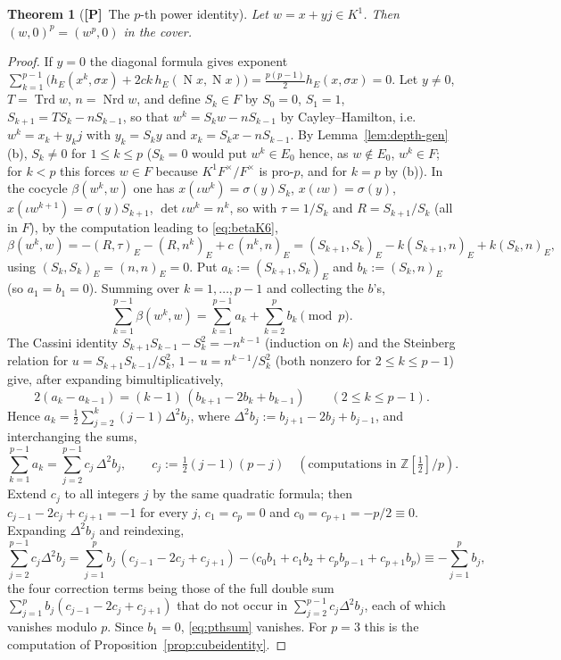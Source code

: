 \documentclass[11pt]{article}
\newcommand{\Z}{\mathbb Z}
\newcommand{\Nm}{\operatorname N}
\newcommand{\Nrd}{\operatorname{Nrd}}
\newcommand{\Trd}{\operatorname{Trd}}
\newcommand{\Ptag}{\textnormal{\textbf{[P]}}}
\theoremstyle{plain}
\newtheorem{theorem}{Theorem}[section]
\theoremstyle{definition}
\begin{document}
\begin{theorem}[\Ptag\ The $p$-th power identity]\label{thm:pthpower}
Let $w=x+yj\in K^1$.  Then $(w,0)^p=(w^p,0)$ in the cover.
\end{theorem}
\begin{proof}
If $y=0$ the diagonal formula gives exponent
$\sum_{k=1}^{p-1}\bigl(h_E(x^k,\sigma x)+2ck\,h_E(\Nm x,\Nm x)\bigr)=\tfrac{p(p-1)}2h_E(x,\sigma x)=0$.
Let $y\ne0$, $T=\Trd w$, $n=\Nrd w$, and define $S_k\in F$ by
$S_0=0$, $S_1=1$, $S_{k+1}=TS_k-nS_{k-1}$, so that
$w^k=S_kw-nS_{k-1}$ by Cayley--Hamilton, i.e.\ $w^k=x_k+y_kj$ with
$y_k=S_ky$ and $x_k=S_kx-nS_{k-1}$.  By Lemma~\ref{lem:depth-gen}(b),
$S_k\ne0$ for $1\le k\le p$ ($S_k=0$ would put $w^k\in E_0$ hence,
as $w\notin E_0$, $w^k\in F$; for $k<p$ this forces $w\in F$ because
$K^1F^\times/F^\times$ is pro-$p$, and for $k=p$ by (b)).  In the cocycle
$\beta(w^k,w)$ one has $x(\iota w^k)=\sigma(y)S_k$, $x(\iota w)=\sigma(y)$,
$x(\iota w^{k+1})=\sigma(y)S_{k+1}$, $\det\iota w^k=n^k$, so with
$\tau=1/S_k$ and $R=S_{k+1}/S_k$ (all in $F$), by the computation
leading to \eqref{eq:betaK6},
\[
 \beta(w^k,w)=-(R,\tau)_E-(R,n^k)_E+c\,(n^k,n)_E
 =(S_{k+1},S_k)_E-k(S_{k+1},n)_E+k(S_k,n)_E ,
\]
using $(S_k,S_k)_E=(n,n)_E=0$.  Put $a_k:=(S_{k+1},S_k)_E$ and
$b_k:=(S_k,n)_E$ (so $a_1=b_1=0$).  Summing over $k=1,\dots,p-1$ and
collecting the $b$'s,
\begin{equation}\label{eq:pthsum}
 \sum_{k=1}^{p-1}\beta(w^k,w)=\sum_{k=1}^{p-1}a_k+\sum_{k=2}^{p}b_k\pmod p .
\end{equation}
The Cassini identity $S_{k+1}S_{k-1}-S_k^2=-n^{k-1}$ (induction on
$k$) and the Steinberg relation for $u=S_{k+1}S_{k-1}/S_k^2$,
$1-u=n^{k-1}/S_k^2$ (both nonzero for $2\le k\le p-1$) give, after
expanding bimultiplicatively,
\[
 2(a_k-a_{k-1})=(k-1)\,(b_{k+1}-2b_k+b_{k-1})\qquad(2\le k\le p-1).
\]
Hence $a_k=\tfrac12\sum_{j=2}^k(j-1)\Delta^2b_j$, where
$\Delta^2b_j:=b_{j+1}-2b_j+b_{j-1}$, and interchanging the sums,
\[
 \sum_{k=1}^{p-1}a_k=\sum_{j=2}^{p-1}c_j\,\Delta^2b_j,\qquad
 c_j:=\tfrac12(j-1)(p-j)\quad(\text{computations in }\Z[\tfrac12]/p).
\]
Extend $c_j$ to all integers $j$ by the same quadratic formula; then
$c_{j-1}-2c_j+c_{j+1}=-1$ for every $j$, $c_1=c_p=0$ and
$c_0=c_{p+1}=-p/2\equiv0$.  Expanding $\Delta^2b_j$ and reindexing,
\[
 \sum_{j=2}^{p-1}c_j\Delta^2b_j
 =\sum_{j=1}^{p}b_j\,(c_{j-1}-2c_j+c_{j+1})
  -\bigl(c_0b_1+c_1b_2+c_pb_{p-1}+c_{p+1}b_p\bigr)
 \equiv-\sum_{j=1}^{p}b_j ,
\]
the four correction terms being those of the full double sum
$\sum_{j=1}^p b_j(c_{j-1}-2c_j+c_{j+1})$ that do not occur in
$\sum_{j=2}^{p-1}c_j\Delta^2b_j$, each of which vanishes modulo $p$.
Since $b_1=0$, \eqref{eq:pthsum} vanishes.  For $p=3$ this is the computation of
Proposition~\ref{prop:cubeidentity}.
\end{proof}
\end{document}
